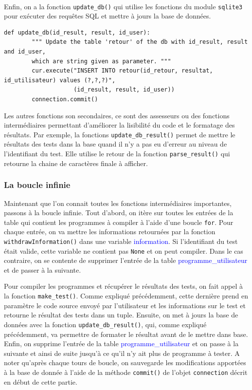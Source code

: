 \documentclass[a4paper]{article}
\renewcommand{\texttt}[2][blue]{\textcolor{#1}{\ttfamily #2}}
\begin{document}
  \\

  Enfin, on a la fonction \lstinline{update_db()} qui utilise les fonctions du
  module \lstinline{sqlite3} pour exécuter des requêtes SQL et mettre à jours
  la base de données.

  \begin{lstlisting}[language=PY]%
    def update_db(id_result, result, id_user):
        """ Update the table 'retour' of the db with id_result, result and id_user,
        which are string given as parameter. """
        cur.execute("INSERT INTO retour(id_retour, resultat, id_utilisateur) values (?,?,?)",
                    (id_result, result, id_user))
        connection.commit()
  \end{lstlisting}

  Les autres fonctions son secondaires, ce sont des assesseurs ou des fonctions
  intermédiaires permettant d'améliorer  la lisibilité du code et le formatage
  des résultats. Par exemple, la fonctions \lstinline{update_db_result()}
  permet de mettre le résultats des tests dans la base quand il n'y a pas eu
  d'erreur au niveau de l'identifiant du test. Elle utilise le retour de la
  fonction \lstinline{parse_result()} qui retourne la chaine de caractères
  finale à afficher.


  \subsubsection{La boucle infinie}%
  \label{ssub:La boucle infinie}

  Maintenant que l'on connait toutes les fonctions intermédiaires importantes,
  passons à la boucle infinie. Tout d'abord, on itère sur toutes les entrées de
  la table qui contient les programmes à compiler à l'aide d'une boucle
  \lstinline{for}. Pour chaque entrée, on va mettre les informations retournées
  par la fonction \lstinline{withdrawInformation()} dans une variable
  \texttt{information}. Si l'identifiant du test était valide, cette variable
  ne contient pas \lstinline{None} et on peut compiler. Dans le cas contraire,
  on se contente de supprimer l'entrée de la table
  \texttt{programme\_utilisateur} et de passer à la suivante.

  Pour compiler les programmes et récupérer le résultats des tests, on fait
  appel à la fonction \lstinline{make_test()}. Comme expliqué précédemment,
  cette dernière prend en paramètre le code source envoyé par l'utilisateur et
  les informations sur le test et retourne le résultat des tests dans un tuple.
  Ensuite, on met à jours la base de données avec la fonction
  \lstinline{update_db_result()}, qui, comme expliqué précédemment, va
  permettre de formater le résultat avant de le mettre dans base. Enfin, on
  supprime l'entrée de la table \texttt{programme\_utilisateur} et on passe à
  la suivante et ainsi de suite jusqu'à ce qu'il n'y ait plus de programme à
  tester. A noter qu'après chaque tours de boucle, on sauvegarde les
  modifications apportées à la base de donnée à l'aide de la méthode
  \lstinline{commit()} de l'objet \lstinline{connection} décrit en début de
  cette partie.
\end{document}
